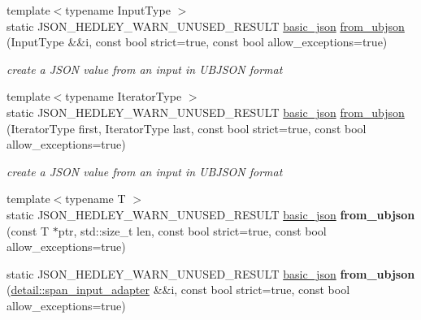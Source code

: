 \begin{DoxyCompactItemize}
\item 
{\footnotesize template$<$typename Input\+Type $>$ }\\static J\+S\+O\+N\+\_\+\+H\+E\+D\+L\+E\+Y\+\_\+\+W\+A\+R\+N\+\_\+\+U\+N\+U\+S\+E\+D\+\_\+\+R\+E\+S\+U\+LT \hyperlink{classnlohmann_1_1basic__json}{basic\+\_\+json} \hyperlink{classnlohmann_1_1basic__json_aa81f62db69978b90ff701f05c72e03a7}{from\+\_\+ubjson} (Input\+Type \&\&i, const bool strict=true, const bool allow\+\_\+exceptions=true)
\begin{DoxyCompactList}\small\item\em create a J\+S\+ON value from an input in U\+B\+J\+S\+ON format \end{DoxyCompactList}\item 
{\footnotesize template$<$typename Iterator\+Type $>$ }\\static J\+S\+O\+N\+\_\+\+H\+E\+D\+L\+E\+Y\+\_\+\+W\+A\+R\+N\+\_\+\+U\+N\+U\+S\+E\+D\+\_\+\+R\+E\+S\+U\+LT \hyperlink{classnlohmann_1_1basic__json}{basic\+\_\+json} \hyperlink{classnlohmann_1_1basic__json_a9dbb422350fed520ce8c1ca8762c0251}{from\+\_\+ubjson} (Iterator\+Type first, Iterator\+Type last, const bool strict=true, const bool allow\+\_\+exceptions=true)
\begin{DoxyCompactList}\small\item\em create a J\+S\+ON value from an input in U\+B\+J\+S\+ON format \end{DoxyCompactList}\item 
\mbox{\label{classnlohmann_1_1basic__json_ab6eeda23c34cee79d8d72f1a8691a8de}} 
{\footnotesize template$<$typename T $>$ }\\static J\+S\+O\+N\+\_\+\+H\+E\+D\+L\+E\+Y\+\_\+\+W\+A\+R\+N\+\_\+\+U\+N\+U\+S\+E\+D\+\_\+\+R\+E\+S\+U\+LT \hyperlink{classnlohmann_1_1basic__json}{basic\+\_\+json} {\bfseries from\+\_\+ubjson} (const T $\ast$ptr, std\+::size\+\_\+t len, const bool strict=true, const bool allow\+\_\+exceptions=true)
\item 
\mbox{\label{classnlohmann_1_1basic__json_a47201396899371881a46562bffb922da}} 
static J\+S\+O\+N\+\_\+\+H\+E\+D\+L\+E\+Y\+\_\+\+W\+A\+R\+N\+\_\+\+U\+N\+U\+S\+E\+D\+\_\+\+R\+E\+S\+U\+LT \hyperlink{classnlohmann_1_1basic__json}{basic\+\_\+json} {\bfseries from\+\_\+ubjson} (\hyperlink{classnlohmann_1_1detail_1_1span__input__adapter}{detail\+::span\+\_\+input\+\_\+adapter} \&\&i, const bool strict=true, const bool allow\+\_\+exceptions=true)

\end{DoxyCompactItemize}
